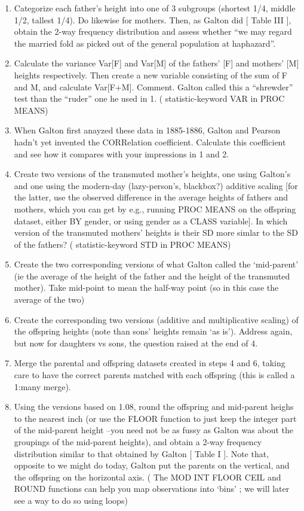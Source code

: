\documentclass[]{book}
\begin{document}
\begin{enumerate}
\def\labelenumi{\arabic{enumi}.}
\item
  Categorize each father's height into one of 3 subgroups (shortest 1/4, middle 1/2, tallest 1/4). Do likewise for mothers. Then, as Galton did {[} Table III {]}, obtain the 2-way frequency distribution and assess whether ``we may regard the married fold as picked out of the general population at haphazard''.
\item
  Calculate the variance Var{[}F{]} and Var{[}M{]} of the fathers' {[}F{]} and mothers' {[}M{]} heights respectively. Then create a new variable consisting of the sum of F and M, and calculate Var{[}F+M{]}. Comment. Galton called this a ``shrewder'' test than the ``ruder'' one he used in 1. ( statistic-keyword VAR in PROC MEANS)
\item
  When Galton first anayzed these data in 1885-1886, Galton and Pearson hadn't yet invented the CORRelation coefficient. Calculate this coefficient and see how it compares with your impressions in 1 and 2.
\item
  Create two versions of the transmuted mother's heights, one using Galton's and one using the modern-day (lazy-person's, blackbox?) additive scaling {[}for the latter, use the observed difference in the average heights of fathers and mothers, which you can get by e.g., running PROC MEANS on the offspring dataset, either BY gender, or using gender as a CLASS variable{]}. In which version of the transmuted mothers' heights is their SD more simlar to the SD of the fathers? ( statistic-keyword STD in PROC MEANS)
\item
  Create the two corresponding versions of what Galton called the `mid-parent' (ie the average of the height of the father and the height of the transmuted mother). Take mid-point to mean the half-way point (so in this case the average of the two)
\item
  Create the corresponding two versions (additive and multiplicative scaling) of the offspring heights (note than sons' heights remain `as is'). Address again, but now for daughters vs sons, the question raised at the end of 4.
\item
  Merge the parental and offspring datasets created in steps 4 and 6, taking care to have the correct parents matched with each offspring (this is called a 1:many merge).
\item
  Using the versions based on 1.08, round the offspring and mid-parent heighs to the nearest inch (or use the FLOOR function to just keep the integer part of the mid-parent height --you need not be as fussy as Galton was about the groupings of the mid-parent heights), and obtain a 2-way frequency distribution similar to that obtained by Galton {[} Table I {]}. Note that, opposite to we might do today, Galton put the parents on the vertical, and the offspring on the horizontal axis. ( The MOD INT FLOOR CEIL and ROUND functions can help you map observations into `bins' ; we will later see a way to do so using loops)

\end{enumerate}
\end{document}
